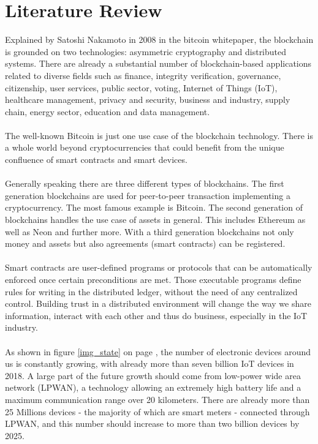 \documentclass[11pt]{article}
\begin{document}
\section{Literature Review}
Explained by Satoshi Nakamoto in 2008 in the bitcoin whitepaper\cite{26}, the blockchain is grounded on two technologies: asymmetric cryptography and distributed systems. There are already a substantial number of blockchain-based applications related to diverse fields such as finance, integrity verification, governance, citizenship, user services, public sector, voting, Internet of Things (IoT), healthcare management, privacy and security, business and industry, supply chain, energy sector, education and data management.\cite{1} \\\\
The well-known Bitcoin is just one use case of the blockchain technology. There is a whole world beyond cryptocurrencies that could benefit from the unique confluence of smart contracts and smart devices. \\\\
Generally speaking there are three different types of blockchains. The first generation blockchains are used for peer-to-peer transaction implementing a cryptocurrency. The most famous example is Bitcoin. The second generation of blockchains handles the use case of assets in general. This includes Ethereum as well as Neon and further more. With a third generation blockchains not only money and assets but also agreements (smart contracts) can be registered.\\\\
Smart contracts are user-defined programs or protocols that can be automatically enforced once certain preconditions are met. Those executable programs define rules for writing in the distributed ledger, without the need of any centralized control. Building trust in a distributed environment will change the way we share information, interact with each other and thus do business, especially in the IoT industry.\cite{2}\\\\
As shown in figure \ref{img_state} on page \pageref{img_state}, the number of electronic devices around us is constantly growing, with already more than seven billion IoT devices in 2018. A large part of the future growth should come from low-power wide area network (LPWAN), a technology allowing an extremely high battery life and a maximum communication range over 20 kilometers. There are already more than 25 Millions devices - the majority of which are smart meters - connected through LPWAN, and this number should increase to more than two billion devices by 2025.\\
\end{document}
